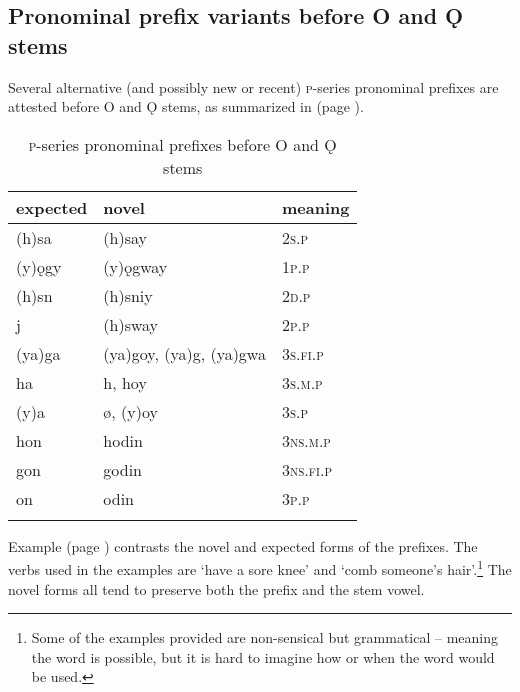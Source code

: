 \subsection{Pronominal prefix variants before O and Ǫ stems}
Several alternative (and possibly new or recent) \textsc{p}-series pronominal prefixes are attested before O and Ǫ stems, as summarized in  (page \pageref{figtab:1:ObeforeO}). 

\begin{table}
\caption{\textsc{p}-series pronominal prefixes before O and Ǫ stems}
\label{figtab:1:ObeforeO}
{
\begin{tabularx}{\textwidth}{XXl}
\lsptoprule
expected & novel & meaning\\
\midrule
(h)sa & (h)say & \textsc{2s.p}\\
(y)ǫgy & (y)ǫgway & \textsc{1p.p}\\
(h)sn & (h)sniy & \textsc{2d.p}\\
j & (h)sway & \textsc{2p.p}\\
(ya)ga & (ya)goy, (ya)g, (ya)gwa & \textsc{3s.fi.p}\\
ha & h, hoy & \textsc{3s.m.p}\\
(y)a & ø, (y)oy & \textsc{3s.p}\\
hon & hodin & \textsc{3ns.m.p}\\
gon & godin & \textsc{3ns.fi.p}\\
on & odin & \textsc{3p.p}\\
\lspbottomrule
\end{tabularx}}
\end{table}

Example  (page \pageref{ex:ppvariation3}) contrasts the novel and expected forms of the prefixes. The verbs used in the examples are  ‘have a sore knee’ and  ‘comb someone’s hair’.\footnote{Some of the examples provided are non-sensical but grammatical -- meaning the word is possible, but it is hard to imagine how or when the  word would be used.} The novel forms all tend to preserve both the prefix and the stem vowel.

